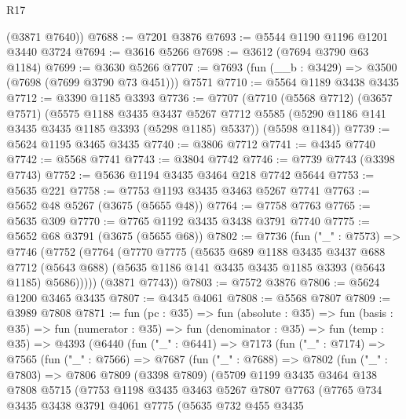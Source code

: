\begin{lexlean}{R17}
\begin{coremodule}
      (@3871 @7640))
@7688 := @7201 @3876
@7693 := @5544 @1190 @1196 @1201 @3440 @3724
@7694 := @3616 @5266
@7698 := @3612 (@7694 @3790 @63 @1184)
@7699 := @3630 @5266
@7707 := @7693 (fun (__b : @3429) => @3500 (@7698 (@7699 @3790 @73 @451))) @7571
@7710 := @5564 @1189 @3438 @3435
@7712 := @3390 @1185 @3393
@7736 := @7707
    (@7710
      (@5568 @7712)
      (@3657 @7571)
      (@5575
        @1188
        @3435
        @3437
        @5267
        @7712
        @5585
        (@5290 @1186 @141 @3435 @3435 @1185 @3393 (@5298 @1185) @5337))
      (@5598 @1184))
@7739 := @5624 @1195 @3465 @3435
@7740 := @3806 @7712
@7741 := @4345 @7740
@7742 := @5568 @7741
@7743 := @3804 @7742
@7746 := @7739 @7743 (@3398 @7743)
@7752 := @5636 @1194 @3435 @3464 @218 @7742 @5644
@7753 := @5635 @221
@7758 := @7753 @1193 @3435 @3463 @5267 @7741
@7763 := @5652 @48 @5267 (@3675 (@5655 @48))
@7764 := @7758 @7763
@7765 := @5635 @309
@7770 := @7765 @1192 @3435 @3438 @3791 @7740
@7775 := @5652 @68 @3791 (@3675 (@5655 @68))
@7802 := @7736
    (fun ("_" : @7573) =>
    @7746
      (@7752
        (@7764
          (@7770
            @7775
            (@5635
              @689
              @1188
              @3435
              @3437
              @688
              @7712
              (@5643 @688)
              (@5635 @1186 @141 @3435 @3435 @1185 @3393 (@5643 @1185) @5686)))))
      (@3871 @7743))
@7803 := @7572 @3876
@7806 := @5624 @1200 @3465 @3435
@7807 := @4345 @4061
@7808 := @5568 @7807
@7809 := @3989 @7808
@7871 := fun (pc : @35) =>
  fun (absolute : @35) =>
  fun (basis : @35) =>
  fun (numerator : @35) =>
  fun (denominator : @35) =>
  fun (temp : @35) =>
  @4393
    (@6440
      (fun ("_" : @6441) =>
      @7173
        (fun ("_" : @7174) =>
        @7565
          (fun ("_" : @7566) =>
          @7687
            (fun ("_" : @7688) =>
            @7802
              (fun ("_" : @7803) =>
              @7806
                @7809
                (@3398 @7809)
                (@5709
                  @1199
                  @3435
                  @3464
                  @138
                  @7808
                  @5715
                  (@7753
                    @1198
                    @3435
                    @3463
                    @5267
                    @7807
                    @7763
                    (@7765
                      @734
                      @3435
                      @3438
                      @3791
                      @4061
                      @7775
                      (@5635
                        @732
                        @455
                        @3435

\end{coremodule}
\end{lexlean}
